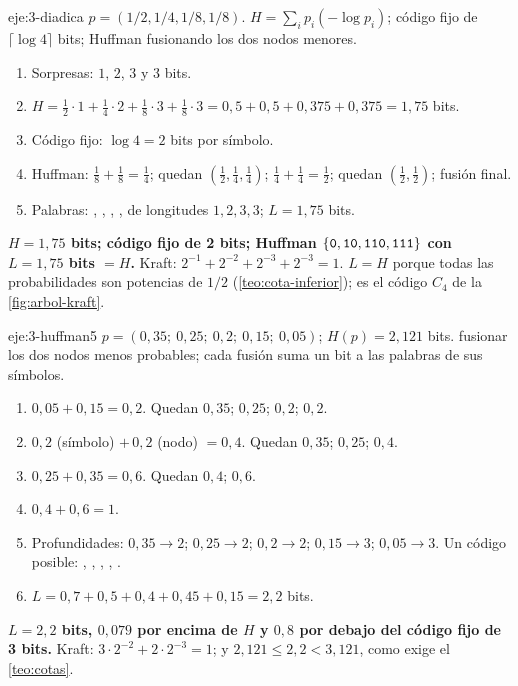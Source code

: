 \begin{solucion}{eje:3-diadica}
\datos $p=(1/2,1/4,1/8,1/8)$.
\planteamiento $H=\sum_ip_i(-\log p_i)$; código fijo de $\lceil\log 4\rceil$ bits; Huffman fusionando los dos nodos menores.
\pasos
\begin{enumerate}[label=\arabic*.]
  \item Sorpresas: $1$, $2$, $3$ y $3$ bits.
  \item $H=\tfrac12\cdot 1+\tfrac14\cdot 2+\tfrac18\cdot 3+\tfrac18\cdot 3=0{,}5+0{,}5+0{,}375+0{,}375=1{,}75$ bits.
  \item Código fijo: $\log 4=2$ bits por símbolo.
  \item Huffman: $\tfrac18+\tfrac18=\tfrac14$; quedan $(\tfrac12,\tfrac14,\tfrac14)$; $\tfrac14+\tfrac14=\tfrac12$; quedan $(\tfrac12,\tfrac12)$; fusión final.
  \item Palabras: , , , , de longitudes $1,2,3,3$; $L=1{,}75$ bits.
\end{enumerate}
\resultado \textbf{$H=1{,}75$ bits; código fijo de 2 bits; Huffman $\{\textnormal{\texttt{0}},\textnormal{\texttt{10}},\textnormal{\texttt{110}},\textnormal{\texttt{111}}\}$ con $L=1{,}75$ bits $=H$.}
\comprobacion Kraft: $2^{-1}+2^{-2}+2^{-3}+2^{-3}=1$. $L=H$ porque todas las probabilidades son potencias de $1/2$ (\cref{teo:cota-inferior}); es el código $C_4$ de la \cref{fig:arbol-kraft}.
\end{solucion}

\begin{solucion}{eje:3-huffman5}
\datos $p=(0{,}35;\ 0{,}25;\ 0{,}2;\ 0{,}15;\ 0{,}05)$; $H(p)=2{,}121$ bits.
\planteamiento fusionar los dos nodos menos probables; cada fusión suma un bit a las palabras de sus símbolos.
\pasos
\begin{enumerate}[label=\arabic*.]
  \item $0{,}05+0{,}15=0{,}2$. Quedan $0{,}35$; $0{,}25$; $0{,}2$; $0{,}2$.
  \item $0{,}2$ (símbolo) $+\,0{,}2$ (nodo) $=0{,}4$. Quedan $0{,}35$; $0{,}25$; $0{,}4$.
  \item $0{,}25+0{,}35=0{,}6$. Quedan $0{,}4$; $0{,}6$.
  \item $0{,}4+0{,}6=1$.
  \item Profundidades: $0{,}35\to 2$; $0{,}25\to 2$; $0{,}2\to 2$; $0{,}15\to 3$; $0{,}05\to 3$. Un código posible: , , , , .
  \item $L=0{,}7+0{,}5+0{,}4+0{,}45+0{,}15=2{,}2$ bits.
\end{enumerate}
\resultado \textbf{$L=2{,}2$ bits, $0{,}079$ por encima de $H$ y $0{,}8$ por debajo del código fijo de 3 bits.}
\comprobacion Kraft: $3\cdot 2^{-2}+2\cdot 2^{-3}=1$; y $2{,}121\le 2{,}2<3{,}121$, como exige el \cref{teo:cotas}.
\end{solucion}

